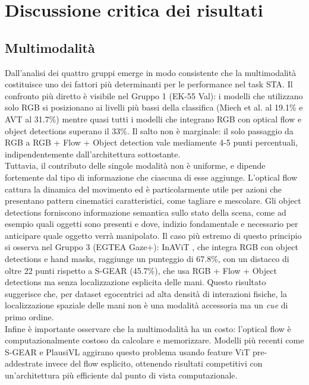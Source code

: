 \section{Discussione critica dei risultati}
\subsection{Multimodalità}
Dall'analisi dei quattro gruppi emerge in modo consistente che la multimodalità costituisce uno dei fattori più determinanti per le performance nel task STA. Il confronto più diretto è visibile nel Gruppo 1 (EK-55 Val): i modelli che utilizzano solo RGB si posizionano ai livelli più bassi della classifica (Miech et al. \cite{miech2019leveraging} al 19.1\% e AVT \cite{girdhar2021anticipative} al 31.7\%) mentre quasi tutti i modelli che integrano RGB con optical flow e object detections superano il 33\%. Il salto non è marginale: il solo passaggio da RGB a RGB + Flow + Object detection vale mediamente 4-5 punti percentuali, indipendentemente dall'architettura sottostante. \\
Tuttavia, il contributo delle singole modalità non è uniforme, e dipende fortemente dal tipo di informazione che ciascuna di esse aggiunge. L'optical flow cattura la dinamica del movimento ed è particolarmente utile per azioni che presentano pattern cinematici caratteristici, come tagliare e mescolare. Gli object detections forniscono informazione semantica sullo stato della scena, come ad esempio quali oggetti sono presenti e dove, indizio fondamentale e necessario per anticipare quale oggetto verrà manipolato. Il caso più estremo di questo principio si osserva nel Gruppo 3 (EGTEA Gaze+): InAViT \cite{roy2024interaction}, che integra RGB con object detections e hand masks, raggiunge un punteggio di 67.8\%, con un distacco di oltre 22 punti rispetto a S-GEAR \cite{diko2024semantically} (45.7\%), che usa RGB + Flow + Object detections ma senza localizzazione esplicita delle mani. Questo risultato suggerisce che, per dataset egocentrici ad alta densità di interazioni fisiche, la localizzazione spaziale delle mani non è una modalità accessoria ma un \textit{cue} di primo ordine. \\
Infine è importante osservare che la multimodalità ha un costo: l'optical flow è computazionalmente costoso da calcolare e memorizzare. Modelli più recenti come S-GEAR \cite{diko2024semantically} e PlausiVL \cite{mittal2024can} aggirano questo problema usando feature ViT pre-addestrate invece del flow esplicito, ottenendo risultati competitivi con un'architettura più efficiente dal punto di vista computazionale.
